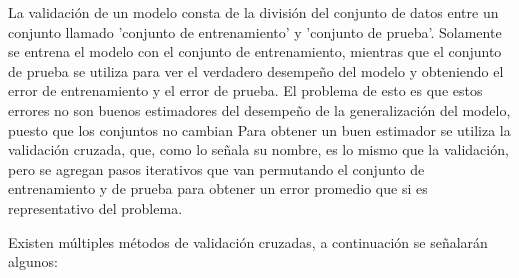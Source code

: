 La validación de un modelo consta de la división del conjunto de datos entre un conjunto llamado 'conjunto de entrenamiento' y 'conjunto de prueba'. Solamente se entrena el modelo con el conjunto de entrenamiento, mientras que el conjunto de prueba se utiliza para ver el verdadero desempeño del modelo y obteniendo el error de entrenamiento y el error de prueba. El problema de esto es que estos errores no son buenos estimadores del desempeño de la generalización del modelo, puesto que los conjuntos no cambian Para obtener un buen estimador se utiliza la validación cruzada, que, como lo señala su nombre, es lo mismo que la validación, pero se agregan pasos iterativos que van permutando el conjunto de entrenamiento y de prueba para obtener un error promedio que si es representativo del problema.

Existen múltiples métodos de validación cruzadas, a continuación se señalarán algunos:
